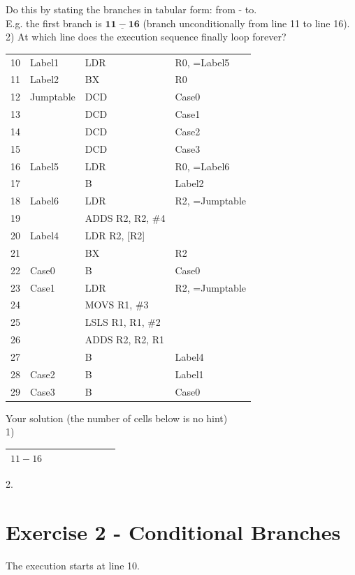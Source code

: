 \documentclass[10pt]{article}
\begin{document}
Do this by stating the branches in tabular form: from - to.\\
E.g. the first branch is $\underline{\mathbf{1 1 - 1 6}}$ (branch unconditionally from line 11 to line 16).\\
2) At which line does the execution sequence finally loop forever?

\begin{center}
\begin{tabular}{|l|lll|}
\hline
10 & Label1 & LDR & R0, =Label5 \\
11 & Label2 & BX & R0 \\
12 & Jumptable & DCD & Case0 \\
13 &  & DCD & Case1 \\
14 &  & DCD & Case2 \\
15 &  & DCD & Case3 \\
16 & Label5 & LDR & R0, =Label6 \\
17 &  & B & Label2 \\
18 & Label6 & LDR & R2, =Jumptable \\
19 &  & ADDS R2, R2, \#4 &  \\
20 & Label4 & LDR R2, [R2] &  \\
21 &  & BX & R2 \\
22 & Case0 & B & Case0 \\
23 & Case1 & LDR & R2, =Jumptable \\
24 &  & MOVS R1, \#3 &  \\
25 &  & LSLS R1, R1, \#2 &  \\
26 &  & ADDS R2, R2, R1 &  \\
27 &  & B & Label4 \\
28 & Case2 & B & Label1 \\
29 & Case3 & B & Case0 \\
\hline
\end{tabular}
\end{center}

Your solution (the number of cells below is no hint)\\
1)

\begin{center}
\begin{tabular}{|l|l|l|l|l|l|l|l|}
\hline
$11-16$ &  &  &  &  &  &  &  \\
\hline
\end{tabular}
\end{center}

2.

\section*{Exercise 2 - Conditional Branches}
The execution starts at line 10.
\end{document}
